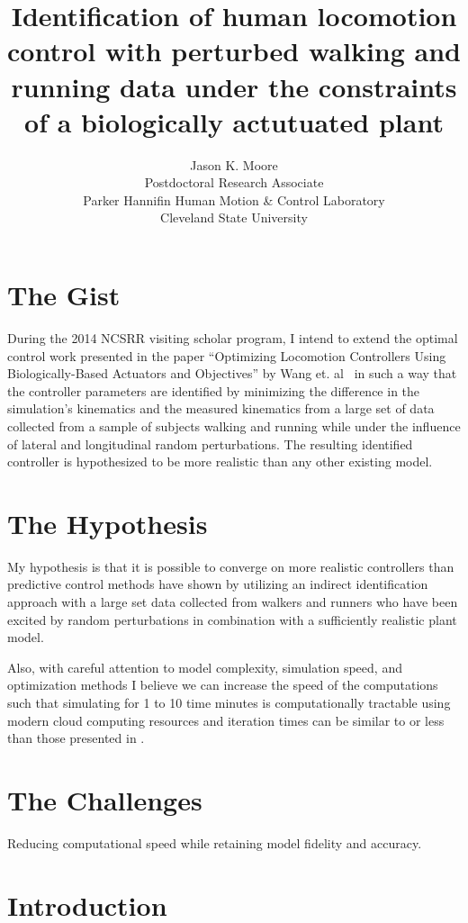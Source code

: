 \documentclass[11pt]{article}
\title{Identification of human locomotion control with perturbed walking and
running data under the constraints of a biologically actutuated plant}
\author{Jason K. Moore\\
  Postdoctoral Research Associate\\
  Parker Hannifin Human Motion \& Control Laboratory\\
  Cleveland State University
}
\begin{document}
\maketitle

\section*{The Gist}

During the 2014 NCSRR visiting scholar program, I intend to extend the optimal
control work presented in the paper ``Optimizing Locomotion Controllers Using
Biologically-Based Actuators and Objectives'' by Wang et. al~\cite{Wang2012} in
such a way that the controller parameters are identified by minimizing the
difference in the simulation's kinematics and the measured kinematics from a
large set of data collected from a sample of subjects walking and running while
under the influence of lateral and longitudinal random perturbations. The
resulting identified controller is hypothesized to be more realistic than any
other existing model.

\section*{The Hypothesis}

My hypothesis is that it is possible to converge on more realistic controllers
than predictive control methods have shown by utilizing an indirect
identification approach with a large set data collected from walkers and
runners who have been excited by random perturbations in combination with a
sufficiently realistic plant model.

Also, with careful attention to model complexity, simulation speed, and
optimization methods I believe we can increase the speed of the computations
such that simulating for 1 to 10 time minutes is computationally tractable
using modern cloud computing resources and iteration times can be similar to or
less than those presented in \cite{Wang2012}.

\section*{The Challenges}

Reducing computational speed while retaining model fidelity and accuracy.

\section*{Introduction}
\end{document}
